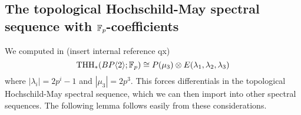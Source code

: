 \begin{comment}
Now in the May spectral sequence for $\THH(B;\Z_p)$, there is still a possibility for $d^{p+1}$-differentials. Note that the source and target of any $d^{p+1}$-differential originating on the 0-line is $a_i$ and a multiple of $a_{i-1}\sigma v_2$.  Recall the following

\begin{thm}(Angelini-Knoll-Culver)
	The homotopy groups of $\THH(B;\Z_p)$ are given by 
	\[
	\Lambda_{\Z_p}(\lambda_1, \lambda_2)\oplus \left(\Z_p\{c_i^{(k)}, d_i^{(k)}\mid i\geq 1, k=1,2\}/p^{\nu_p(i)+1}c_i^{(k)}, p^{\nu_p(i)+1}d_i^{(k)}\right)
	\]
	with degrees 
	\begin{enumerate}
		\item $|c_i^{(1)}| = 2ip^3-1$
		\item $|c_i^{(2)}| = 2ip^3+2p-2$
		\item $|d_i^{(1)}| = 2ip^3+2p^2-2$
		\item $|d_i^{(2)}| = 2ip^3+2p^2+2p-3$
	\end{enumerate}
\end{thm}

This forces a unique pattern of differentials and hidden extensions. 

\begin{prop}
	The $E^{p+1}$-page of the $\THH$-May spectral sequence for $\THH(B;\Z_p)$ has  differentials given by 
	\[
	d^{p+1}(a_i)\, \dot{=}\, p^{\max(0, \nu_p(i-1)-\nu_p(i))}\sigma v_2\cdot a_{i-1},
	\]
	and 
	\[
	d^{p+1}(b_i)\, \dot{=}\, p^{\max(0, \nu_p(i-1)-\nu_p(i))}\sigma v_2\cdot b_{i-1}
	\]
	for $i>1$, and there are no other differentials. Moreover, there are no rooms for longer differentials for degree reasons, so $E^{p+2}\cong E^\infty$. Furthermore, $pa_{pn}$ detects $c_n^{(1)}$ and $pb_{pn}$ detects $c_n^{(2)}$, and also $\sigma v_2 a_{pn}$ detects $d_n^{(1)}$ and $\sigma v_2 b_{pn}$ detects $d_n^{(2)}$; for $n>0$. This also implies the necessary family of hidden extensions.  
\end{prop}
\end{comment}
\subsection{The topological Hochschild-May spectral sequence with $\mathbb{F}_p$-coefficients}
We computed in (insert internal reference qx) 
\[
\operatorname{THH}_*(BP\langle 2 \rangle;\mathbb{F}_p)\cong P(\mu_3)\otimes E(\lambda_1, \lambda_2, \lambda_3)
\]
where $|\lambda_i| = 2p^i-1$ and $|\mu_3|=2p^3$. This forces differentials in the topological Hochschild-May spectral sequence, which we can then import into other spectral sequences. The following lemma follows easily from these considerations.

